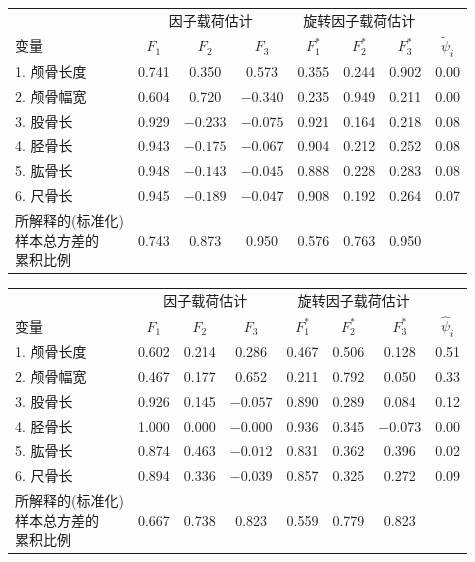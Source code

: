 
\begin{mvtable}
\label{tab:9.10}
\small
\begin{tabular}{lccccccc}
\toprule
& \multicolumn{3}{c}{因子载荷估计} & \multicolumn{3}{c}{旋转因子载荷估计} & \\
\cmidrule(lr){2-4}\cmidrule(lr){5-7}
变\quad 量 & $F_1$ & $F_2$ & $F_3$ & $F_1^{*}$ & $F_2^{*}$ & $F_3^{*}$ & $\tilde{\psi}_i$\\
\midrule
1. 颅骨长度 & 0.741 & 0.350 & 0.573 & 0.355 & 0.244 & 0.902 & 0.00\\
2. 颅骨幅宽 & 0.604 & 0.720 & $-0.340$ & 0.235 & 0.949 & 0.211 & 0.00\\
3. 股骨长 & 0.929 & $-0.233$ & $-0.075$ & 0.921 & 0.164 & 0.218 & 0.08\\
4. 胫骨长 & 0.943 & $-0.175$ & $-0.067$ & 0.904 & 0.212 & 0.252 & 0.08\\
5. 肱骨长 & 0.948 & $-0.143$ & $-0.045$ & 0.888 & 0.228 & 0.283 & 0.08\\
6. 尺骨长 & 0.945 & $-0.189$ & $-0.047$ & 0.908 & 0.192 & 0.264 & 0.07\\
\midrule
\makecell[l]{所解释的(标准化)\\样本总方差的\\累积比例}
 & 0.743 & 0.873 & 0.950 & 0.576 & 0.763 & 0.950 & \\
\bottomrule
\end{tabular}

\vspace{10pt}
\begin{tabular}{lccccccc}
\toprule
& \multicolumn{3}{c}{因子载荷估计} & \multicolumn{3}{c}{旋转因子载荷估计} & \\
\cmidrule(lr){2-4}\cmidrule(lr){5-7}
变\quad 量 & $F_1$ & $F_2$ & $F_3$ & $F_1^{*}$ & $F_2^{*}$ & $F_3^{*}$ & $\hat{\psi}_i$\\
\midrule
1. 颅骨长度 & 0.602 & 0.214 & 0.286 & 0.467 & 0.506 & 0.128 & 0.51\\
2. 颅骨幅宽 & 0.467 & 0.177 & 0.652 & 0.211 & 0.792 & 0.050 & 0.33\\
3. 股骨长 & 0.926 & 0.145 & $-0.057$ & 0.890 & 0.289 & 0.084 & 0.12\\
4. 胫骨长 & 1.000 & 0.000 & $-0.000$ & 0.936 & 0.345 & $-0.073$ & 0.00\\
5. 肱骨长 & 0.874 & 0.463 & $-0.012$ & 0.831 & 0.362 & 0.396 & 0.02\\
6. 尺骨长 & 0.894 & 0.336 & $-0.039$ & 0.857 & 0.325 & 0.272 & 0.09\\
\midrule
\makecell[l]{所解释的(标准化)\\样本总方差的\\累积比例}
 & 0.667 & 0.738 & 0.823 & 0.559 & 0.779 & 0.823 & \\
\bottomrule
\end{tabular}
\end{mvtable}

